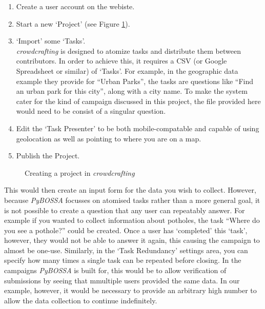 \documentclass{article}
\begin{document}
		\begin{enumerate}
			\item Create a user account on the webiste.
			\item Start a new `Project' (see Figure \ref{fig:cc-create}).
			\item `Import' some `Tasks'.\\
			\textit{crowdcrafting} is designed to atomize tasks and distribute them between contributors. In order to achieve this, it requires a CSV (or Google Spreadsheet or similar) of `Tasks'. For example, in the geographic data example they provide for ``Urban Parks'', the tasks are questions like ``Find an urban park for this city'', along with a city name\cite{_urban_????}. To make the system cater for the kind of campaign discussed in this project, the file provided here would need to be consist of a singular question.
			\item Edit the `Task Presenter' to be both mobile-compatable and capable of using geolocation as well as pointing to where you are on a map.
			\item Publish the Project.
		\end{enumerate}

		\begin{figure}[hb]
			\centering
			\caption{Creating a project in \textit{crowdcrafting}}
			\label{fig:cc-create}
		\end{figure}

		This would then create an input form for the data you wish to collect. However, because \textit{PyBOSSA} focusses on atomised tasks rather than a more general goal, it is not possible to create a question that any user can repeatably answer. For example if you wanted to collect information about potholes, the task ``Where do you see a pothole?'' could be created. Once a user has `completed' this `task', however, they would not be able to answer it again, this causing the campaign to almost be one-use. Similarly, in the `Task Redundancy' settings area, you can specify how many times a single task can be repeated before closing. In the campaigns \textit{PyBOSSA} is built for, this would be to allow verification of submissions by seeing that mmultiple users provided the same data. In our example, however, it would be necessary to provide an arbitrary high number to allow the data collection to continue indefinitely.
\end{document}
